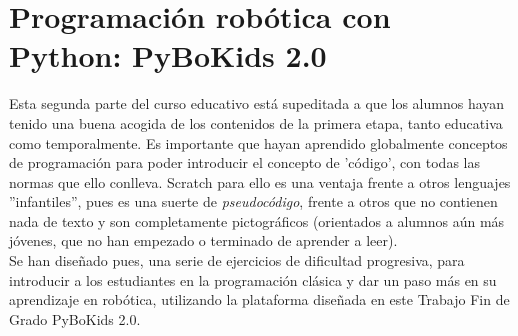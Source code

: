 \section{Programación robótica con Python: PyBoKids 2.0}\label{sec:Python}
Esta segunda parte del curso educativo está supeditada a que los alumnos hayan tenido una buena acogida de los contenidos de la primera etapa, tanto educativa como temporalmente. Es importante que hayan aprendido globalmente conceptos de programación para poder introducir el concepto de 'código', con todas las normas que ello conlleva. Scratch para ello es una ventaja frente a otros lenguajes ''infantiles'', pues es una suerte de \textit{pseudocódigo}, frente a otros que no contienen nada de texto y son completamente pictográficos (orientados a alumnos aún más jóvenes, que no han empezado o terminado de aprender a leer). \\
Se han diseñado pues, una serie de ejercicios de dificultad progresiva, para introducir a los estudiantes en la programación clásica y dar un paso más en su aprendizaje en robótica, utilizando la plataforma diseñada en este Trabajo Fin de Grado PyBoKids 2.0.
